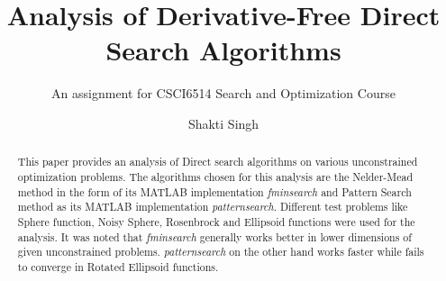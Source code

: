 \documentclass[sigconf]{acmart}
\begin{document}
\title{Analysis of Derivative-Free Direct Search Algorithms}
\subtitle{An assignment for CSCI6514 Search and Optimization Course}

\author{Shakti Singh}


\begin{abstract}
This paper provides an analysis of Direct search algorithms on various unconstrained optimization problems. The algorithms chosen for this analysis are the Nelder-Mead method in the form of its MATLAB implementation \textit{fminsearch} and Pattern Search method as its MATLAB implementation \textit{patternsearch}. Different test problems like Sphere function, Noisy Sphere, Rosenbrock and Ellipsoid functions were used for the analysis. It was noted that \textit{fminsearch} generally works better in lower dimensions of given unconstrained problems. \textit{patternsearch} on the other hand works faster while fails to converge in Rotated Ellipsoid functions.
\end{abstract}

%
%
\begin{CCSXML}
\end{CCSXML}


\maketitle




\end{document}
